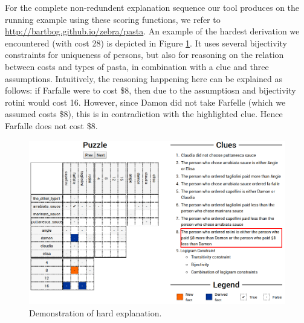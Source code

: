 For the complete non-redundent explanation sequence our tool produces on the running example using these scoring functions, we refer to \url{http://bartbog.github.io/zebra/pasta}. An example of the hardest derivation we encountered (with cost 28) is depicted in Figure \ref{fig:screen2}. It uses several bijectivity constraints for uniqueness of persons, but also for reasoning on the relation between costs and types of pasta, in combination with a clue and three assumptions.
Intuitively, the reasoning happening here can be explained as follows: if Farfalle were to cost \$8, then due to the assumptiosn and bijectivity rotini would cost 16. However, since Damon did not take Farfelle (which we assumed costs \$8), this is in contradiction with the highlighted clue. Hence Farfalle does not cost \$8. 


\begin{figure}[t]
\centering
\includegraphics[width=1\linewidth]{zebra_screen_2}
\caption{Demonstration of hard explanation.}
\label{fig:screen2}
\end{figure}




